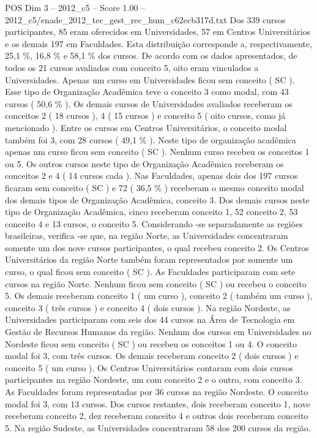 \begin{textsample}{POS Dim 3 – 2012\_c5 – Score 1.00 – 2012\_c5/enade\_2012\_tec\_gest\_rec\_hum\_c62ecb317d.txt}
Dos 339 cursos participantes, 85 eram oferecidos em Universidades, 57 em Centros Universitários e os demais 197 em Faculdades.
Esta distribuição corresponde a, respectivamente, 25,1 \%, 16,8 \% e 58,1 \% dos cursos.
De acordo com os dados apresentados, de todos os 21 cursos avaliados com conceito 5, oito eram vinculados a Universidades.
Apenas um curso em Universidades ficou sem conceito ( SC ).
Esse tipo de Organização Acadêmica teve o conceito 3 como modal, com 43 cursos ( 50,6 \% ).
Os demais cursos de Universidades avaliados receberam os conceitos 2 ( 18 cursos ), 4 ( 15 cursos ) e conceito 5 ( oito cursos, como já mencionado ).
Entre os cursos em Centros Universitários, o conceito modal também foi 3, com 28 cursos ( 49,1 \% ).
Neste tipo de organização acadêmica apenas um curso ficou sem conceito ( SC ).
Nenhum curso recebeu os conceitos 1 ou 5.
Os outros cursos neste tipo de Organização Acadêmica receberam os conceitos 2 e 4 ( 14 cursos cada ).
Nas Faculdades, apenas dois dos 197 cursos ficaram sem conceito ( SC ) e 72 ( 36,5 \% ) receberam o mesmo conceito modal dos demais tipos de Organização Acadêmica, conceito 3.
Dos demais cursos neste tipo de Organização Acadêmica, cinco receberam conceito 1, 52 conceito 2, 53 conceito 4 e 13 cursos, o conceito 5.
Considerando -se separadamente as regiões brasileiras, verifica -se que, na região Norte, as Universidades concentraram somente um dos nove cursos participantes, o qual recebeu conceito 2.
Os Centros Universitários da região Norte também foram representados por somente um curso, o qual ficou sem conceito ( SC ).
As Faculdades participaram com sete cursos na região Norte.
Nenhum ficou sem conceito ( SC ) ou recebeu o conceito 5.
Os demais receberam conceito 1 ( um curso ), conceito 2 ( também um curso ), conceito 3 ( três cursos ) e conceito 4 ( dois cursos ).
Na região Nordeste, as Universidades participaram com seis dos 44 cursos na Área de Tecnologia em Gestão de Recursos Humanos da região.
Nenhum dos cursos em Universidades no Nordeste ficou sem conceito ( SC ) ou recebeu os conceitos 1 ou 4.
O conceito modal foi 3, com três cursos.
Os demais receberam conceito 2 ( dois cursos ) e conceito 5 ( um curso ).
Os Centros Universitários contaram com dois cursos participantes na região Nordeste, um com conceito 2 e o outro, com conceito 3.
As Faculdades foram representadas por 36 cursos na região Nordeste.
O conceito modal foi 3, com 13 cursos.
Dos cursos restantes, dois receberam conceito 1, nove receberam conceito 2, dez receberam conceito 4 e outros dois receberam conceito 5.
Na região Sudeste, as Universidades concentraram 58 dos 200 cursos da região.

\end{textsample}
